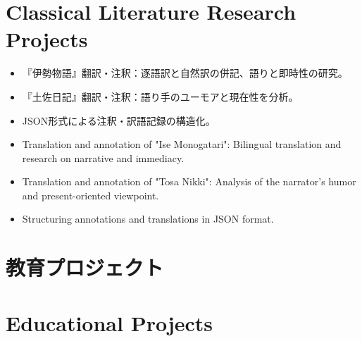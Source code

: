 \documentclass{bxjsarticle}
\begin{document}
  \section{Classical Literature Research Projects}
\fi
\begin{itemize}
\ifJPN
  \item 『伊勢物語』翻訳・注釈：逐語訳と自然訳の併記、語りと即時性の研究。
  \item 『土佐日記』翻訳・注釈：語り手のユーモアと現在性を分析。
  \item JSON形式による注釈・訳語記録の構造化。
\else
  \item Translation and annotation of "Ise Monogatari": Bilingual translation and research on narrative and immediacy.
  \item Translation and annotation of "Tosa Nikki": Analysis of the narrator's humor and present-oriented viewpoint.
  \item Structuring annotations and translations in JSON format.
\fi
\end{itemize}

\ifJPN
\section{教育プロジェクト}
\else
  \section{Educational Projects}
\fi
\end{document}
